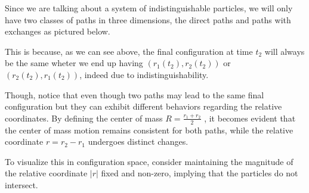 \documentclass[12pt]{report}
\begin{document}
\begin{minipage}{1 \textwidth}
		Since we are talking about a system of indistinguishable particles, we will only have two classes of paths in three dimensions, the direct paths and paths with exchanges as pictured below.\newline
		
		
	    This is because, as we can see above, the final configuration at time $t_2$ will always be the same wheter we end up having $(r_1(t_2),r_2(t_2))$ or $(r_2(t_2),r_1(t_2))$, indeed due to indistinguishability.\newline
		
		Though, notice that even though two paths may lead to the same final configuration but they can exhibit different behaviors regarding the relative coordinates. By defining the center of mass $R= \frac{r_1+r_2}{2}$ , it becomes evident that the center of mass motion remains consistent for both paths, while the relative coordinate $r=r_2-r_1$ undergoes distinct changes.
		
		To visualize this in configuration space, consider maintaining the magnitude of the relative coordinate $|r|$ fixed and non-zero, implying that the particles do not intersect. \newline 
		
	
		
	\end{minipage}
	
\end{document}
